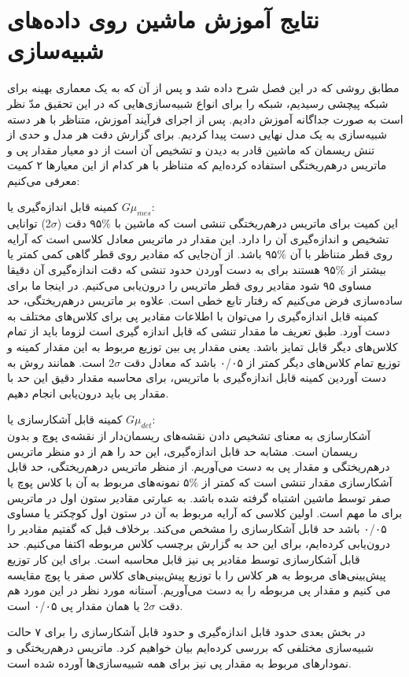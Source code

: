 

\section{نتایج آموزش ماشین روی داده‌های شبیه‌سازی }
\label{sec:results}

مطابق روشی که در این فصل شرح داده شد و پس از آن که به یک معماری بهینه برای شبکه پیچشی رسیدیم، شبکه را برای انواع شبیه‌سازی‌هایی که در این تحقیق مدّ نظر است به صورت جداگانه آموزش دادیم. پس از اجرای فرآیند آموزش، متناظر با هر دسته شبیه‌سازی به یک مدل نهایی دست پیدا کردیم. برای گزارش دقت هر مدل و حدی از تنش ریسمان که ماشین قادر به دیدن و تشخیص آن است از دو معیار مقدار پی و ماتریس درهم‌ریختگی استفاده کرده‌ایم که متناظر با هر کدام از این معیارها ۲ کمیت معرفی می‌کنیم:
\begin{description}
	\item
	کمینه قابل اندازه‌گیری یا $G\mu_{mes}$:\\
	این کمیت برای ماتریس درهم‌ریختگی تنشی است که ماشین با $\%$۹۵ دقت ($\sigma$2) توانایی تشخیص و اندازه‌گیری آن را دارد. این مقدار در ماتریس معادل کلاسی است که آرایه روی قطر متناظر با آن $\%$۹۵ باشد. از آن‌جایی که مقادیر روی قطر گاهی کمی کمتر یا بیشتر از $\%$۹۵ هستند برای به دست آوردن حدود تنشی که دقت اندازه‌گیری آن دقیقا مساوی ۹۵ شود مقادیر روی قطر ماتریس را درون‌یابی می‌کنیم. در اینجا ما برای ساده‌سازی فرض می‌کنیم که رفتار تابع خطی است.
	علاوه بر ماتریس درهم‌ریختگی، حد کمینه قابل اندازه‌گیری را می‌توان با اطلاعات مقادیر پی برای کلاس‌های مختلف به دست آورد. طبق تعریف ما مقدار تنشی که قابل اندازه گیری است لزوما باید از تمام کلاس‌های دیگر قابل تمایز باشد. یعنی مقدار پی بین توزیع مربوط به این مقدار کمینه و توزیع تمام کلاس‌های دیگر کمتر از ۰/۰۵ باشد که معادل دقت $\sigma$2 است. همانند روش به دست آوردین کمینه قابل اندازه‌گیری با ماتریس، برای محاسبه مقدار دقیق این حد با مقدار پی باید درون‌یابی انجام دهیم.     
	\item
	کمینه قابل آشکارسازی یا $G\mu_{det}$:\\
	آشکارسازی به معنای تشخیص دادن نقشه‌های ریسمان‌دار از نقشه‌ی پوچ و بدون ریسمان است. مشابه حد قابل اندازه‌گیری، این حد را هم از دو منظر ماتریس درهم‌ریختگی و مقدار پی به دست می‌آوریم. از منظر ماتریس درهم‌ریختگی، حد قابل آشکارسازی مقدار تنشی است که کمتر از $\%$۵ نمونه‌های مربوط به آن با کلاس پوچ یا صفر توسط ماشین اشتباه گرفته شده باشد. به عبارتی مقادیر ستون اول در ماتریس برای ما مهم است. اولین کلاسی که آرایه مربوط به آن در ستون اول کوچکتر یا مساوی ۰/۰۵ باشد حد قابل آشکارسازی را مشخص می‌کند. برخلاف قبل که گفتیم مقادیر را درون‌یابی کرده‌ایم، برای این حد به گزارش برچسب کلاس مربوطه اکتفا می‌کنیم. حد قابل آشکارسازی توسط مقادیر پی نیز قابل محاسبه است. برای این کار توزیع پیش‌بینی‌های مربوط به هر کلاس را با توزیع پیش‌بینی‌های کلاس صفر یا پوچ مقایسه می کنیم و مقدار پی مربوطه را به دست می‌آوریم. آستانه مورد نظر در این مورد هم دقت $\sigma$2 یا همان مقدار پی ۰/۰۵ است.   	    
\end{description}
در بخش بعدی حدود قابل اندازه‌گیری و حدود قابل آشکارسازی را برای ۷ حالت شبیه‌سازی مختلفی که بررسی کرده‌ایم بیان خواهیم کرد. ماتریس در‌هم‌ریختگی و نمودار‌های مربوط به مقدار پی نیز برای همه شبیه‌سازی‌ها آورده شده است.    
